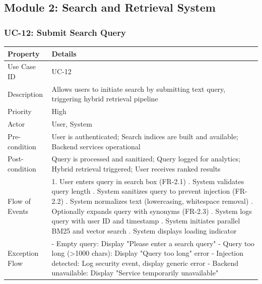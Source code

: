 \subsection*{Module 2: Search and Retrieval System}

\subsubsection*{UC-12: Submit Search Query}

\begin{table}[H]
\small
\begin{tabularx}{\textwidth}{|p{}|X|}
\hline
\textbf{Property} & \textbf{Details} \\
\hline
Use Case ID & UC-12 \\
\hline
Description & Allows users to initiate search by submitting text query, triggering hybrid retrieval pipeline \\
\hline
Priority & High \\
\hline
Actor & User, System \\
\hline
Pre-condition & User is authenticated; Search indices are built and available; Backend services operational \\
\hline
Post-condition & Query is processed and sanitized; Query logged for analytics; Hybrid retrieval triggered; User receives ranked results \\
\hline
Flow of Events & 1. User enters query in search box (FR-2.1) \newline 2. System validates query length \newline 3. System sanitizes query to prevent injection (FR-2.2) \newline 4. System normalizes text (lowercasing, whitespace removal) \newline 5. Optionally expands query with synonyms (FR-2.3) \newline 6. System logs query with user ID and timestamp \newline 7. System initiates parallel BM25 and vector search \newline 8. System displays loading indicator \\
\hline
Exception Flow & - Empty query: Display "Please enter a search query" \newline - Query too long (>1000 chars): Display "Query too long" error \newline - Injection detected: Log security event, display generic error \newline - Backend unavailable: Display "Service temporarily unavailable" \\
\hline
\end{tabularx}
\end{table}

